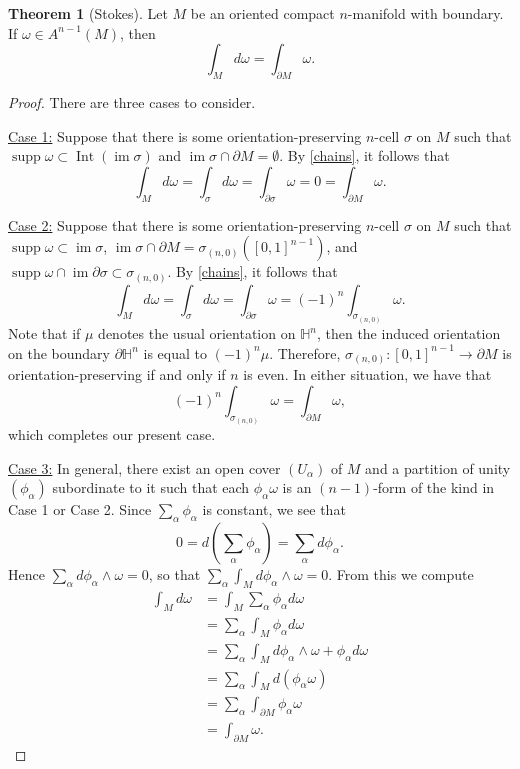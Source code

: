 \documentclass[10pt,letterpaper,cm]{nupset}
\theoremstyle{definition}
\theoremstyle{theorem}
\newtheorem{theorem}[definition]{Theorem}
\theoremstyle{remark}
\renewcommand{\H}{\mathbb H}
\newcommand{\1}{\mathbf{1}}
\newcommand{\0}{\vec 0}
\DeclareMathOperator{\im}{im}
\DeclareMathOperator{\Int}{Int}
\DeclareMathOperator{\supp}{supp}
\begin{document}
\begin{theorem}[Stokes]\label{stokes}
Let $M$ be an oriented compact $n$-manifold with boundary. If $\omega \in A^{n-1}(M)$, then $$ \int_M d\omega = \int_{\partial{M}} \omega  .$$
\end{theorem}
\begin{proof} There are three cases to consider.

\medskip


\underline{Case 1:} Suppose that there is some orientation-preserving $n$-cell $\sigma$ on $M$ such that $\supp \omega \subset \Int(\im \sigma)$ and $\im \sigma \cap \partial{M} =\emptyset$. By \cref{chains}, it follows that $$\int_M d\omega  = \int_{\sigma} d\omega = \int_{\partial{\sigma}} \omega = 0 = \int_{\partial{M}} \omega    .$$

\medskip


\underline{Case 2:} Suppose that there is some orientation-preserving $n$-cell $\sigma$ on $M$ such that $\supp \omega \subset  \im \sigma$, $\im \sigma \cap \partial{M} =\sigma_{(n,0)}\left(\left[0,1\right]^{n-1}\right)$, and $\supp \omega \cap \im \partial{\sigma} \subset \sigma_{(n,0)}$. By \cref{chains}, it follows that $$\int_M d\omega  = \int_{\sigma} d\omega = \int_{\partial{\sigma}} \omega = ({-1})^n \int_{\sigma_{(n,0)}} \omega .$$ Note that if $\mu$ denotes the usual orientation on $\H^n$, then the induced orientation on the boundary $\partial{\H^n}$ is equal to $({-1})^n \mu$. Therefore, $\sigma_{(n,0)} : \left[0,1\right]^{n-1}\to \partial{M}$ is orientation-preserving  if and only if $n$ is even. In either situation, we have that $$({-1})^n \int_{\sigma_{(n,0)}} \omega = \int_{\partial{M}} \omega  ,$$ which completes our present case.

\medskip


\underline{Case 3:} In general, there exist an open cover $(U_{\alpha})$ of $M$ and a partition of unity $(\phi_{\alpha})$ subordinate to it such that each $\phi_{\alpha}\omega$ is an $(n-1)$-form of the kind in Case 1 or Case 2. Since $\sum_{\alpha} \phi_{\alpha}$ is constant, we see that $$0 = d\left(\sum_{\alpha} \phi_{\alpha} \right) = \sum_{\alpha} d \phi_{\alpha}.$$ Hence $ \sum_{\alpha} d \phi_{\alpha} \wedge \omega =0$, so that $\sum_{\alpha} \int_M d\phi_{\alpha} \wedge \omega =0$. From this we compute
\begin{align*}
 \int_M d\omega & = \int_M \sum_{\alpha} \phi_{\alpha} d\omega 
 \\ & = \sum_{\alpha}\int_M \phi_{\alpha} d\omega
\\ & =  \sum_{\alpha}\int_M d\phi_{\alpha} \wedge \omega + \phi_{\alpha} d\omega 
\\ & =  \sum_{\alpha}\int_M d(\phi_{\alpha} \omega)
\\ & = \sum_{\alpha} \int_{\partial{M}} \phi_{\alpha} \omega 
\\ & =  \int_{\partial{M}} \omega .
\end{align*}
\end{proof}
\end{document}
